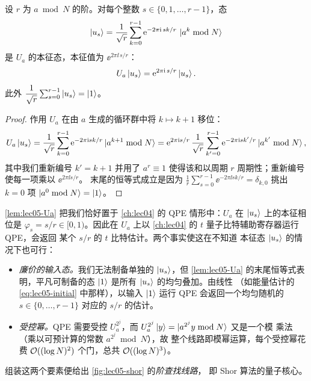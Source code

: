 \begin{lemma}[模乘酉算符的本征相位]
\label{lem:lec05-Ua}
设 $r$ 为 $a\bmod N$ 的阶。对每个整数 $s\in\{0,1,\dots,r-1\}$，态
\[
  \ket{u_s}=\frac{1}{\sqrt r}\sum_{k=0}^{r-1}
             \mathrm{e}^{-2\pi\mathrm{i}\, sk/r}\,\ket{a^{k}\bmod N}
\]
是 $U_a$ 的本征态，本征值为 $\ee^{2\pi\ii\, s/r}$：
\[
  U_a\ket{u_s}=\mathrm{e}^{2\pi\mathrm{i}\, s/r}\ket{u_s}.
\]
此外 $\dfrac{1}{\sqrt r}\sum_{s=0}^{r-1}\ket{u_s}=\ket{1}$。
\end{lemma}

\begin{proof}
作用 $U_a$ 在由 $a$ 生成的循环群中将 $k\mapsto k+1$ 移位：
\[
  U_a\ket{u_s}=\frac{1}{\sqrt r}\sum_{k=0}^{r-1}
    \mathrm{e}^{-2\pi\mathrm{i} sk/r}\ket{a^{k+1}\bmod N}
   =\mathrm{e}^{2\pi\mathrm{i} s/r}\,\frac{1}{\sqrt r}\sum_{k'=0}^{r-1}
    \mathrm{e}^{-2\pi\mathrm{i} sk'/r}\ket{a^{k'}\bmod N},
\]
其中我们重新编号 $k'=k+1$ 并用了 $a^{r}\equiv1$ 使得该和以周期 $r$
周期性；重新编号使每一项乘以 $\ee^{2\pi\ii s/r}$。
末尾的恒等式成立是因为
$\frac1r\sum_{s=0}^{r-1}\ee^{-2\pi\ii sk/r}=\delta_{k,0}$ 挑出 $k=0$ 项
$\ket{a^0\bmod N}=\ket{1}$。
\end{proof}

\cref{lem:lec05-Ua} 把我们恰好置于 \cref{ch:lec04} 的 QPE 情形中：$U_a$ 在
$\ket{u_s}$ 上的本征相位是 $\varphi_s=s/r\in[0,1)$。因此在
$U_a$ 上以 \cref{ch:lec04} 的 $t$ 量子比特辅助寄存器运行 QPE，会返回
某个 $s/r$ 的 $t$ 比特估计。两个事实使这在不知道
本征态 $\ket{u_s}$ 的情况下也可行：
\begin{itemize}[leftmargin=1.4em,nosep]
  \item \emph{廉价的输入态。}我们无法制备单独的 $\ket{u_s}$，但
        \cref{lem:lec05-Ua} 的末尾恒等式表明，平凡可制备的态
        $\ket{1}$ 是所有 $\ket{u_s}$ 的均匀叠加。由线性
        （如能量估计的 \cref{eq:lec05-initial} 中那样），以输入
        $\ket{1}$ 运行 QPE 会返回一个均匀随机的
        $s\in\{0,\dots,r-1\}$ 对应的 $s/r$ 的估计。
  \item \emph{受控幂。}QPE 需要受控 $U_a^{2^{j}}$，而
        $U_a^{2^{j}}\ket{y}=\ket{a^{2^{j}}y\bmod N}$ 又是一个模
        乘法（乘以可预计算的常数 $a^{2^{j}}\bmod N$），故
        整个线路即模幂运算，每个受控幂花费
        $\mathcal{O}((\log N)^{2})$ 个门，总共 $\mathcal{O}((\log N)^{3})$。
\end{itemize}

组装这两个要素便给出 \cref{fig:lec05-shor} 的\emph{阶查找线路}，
即 Shor 算法的量子核心。


